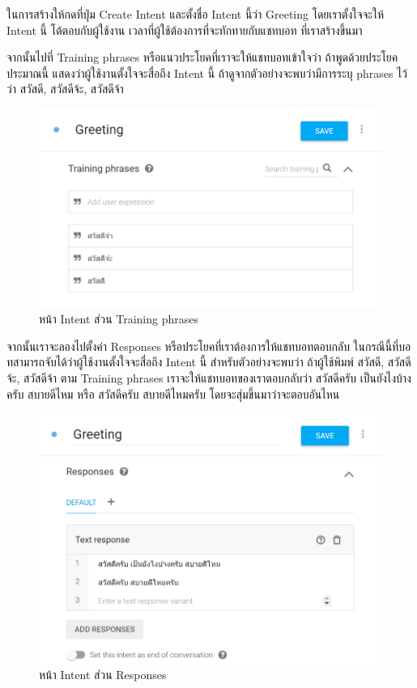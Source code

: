 \begin{enumerate}
	ในการสร้างให้กดที่ปุ่ม Create Intent และตั้งชื่อ Intent นี้ว่า Greeting โดยเราตั้งใจจะให้ Intent นี้ โต้ตอบกับผู้ใช้งาน เวลาที่ผู้ใช้ต้องการที่จะทักทายกับแชทบอท ที่เราสร้างขึ้นมา

	จากนั้นไปที่ Training phrases หรือแนวประโยคที่เราจะให้แชทบอทเข้าใจว่า ถ้าพูดด้วยประโยคประมาณนี้ แสดงว่าผู้ใช้งานตั้งใจจะสื่อถึง Intent นี้ ถ้าดูจากตัวอย่างจะพบว่ามีการระบุ phrases ไว้ว่า สวัสดี, สวัสดีจ้ะ, สวัสดีจ้า

	\begin{figure}[H]
		\centering
		\includegraphics[width=0.7\columnwidth]{Figures/2/dialogflow_3}
		\caption{หน้า Intent ส่วน Training phrases}
		\label{Fig:dialogflow3}
	\end{figure}
	
	จากนั้นเราจะลองไปตั้งค่า Responses หรือประโยคที่เราต้องการให้แชทบอทตอบกลับ ในกรณีนี้ที่บอทสามารถจับได้ว่าผู้ใช้งานตั้งใจจะสื่อถึง Intent นี้ สำหรับตัวอย่างจะพบว่า ถ้าผู้ใช้พิมพ์ สวัสดี, สวัสดีจ้ะ, สวัสดีจ้า ตาม Training phrases เราจะให้แชทบอทของเราตอบกลับว่า สวัสดีครับ เป็นยังไงบ้างครับ สบายดีไหม หรือ สวัสดีครับ สบายดีไหมครับ โดยจะสุ่มขึ้นมาว่าจะตอบอันไหน
	
	\begin{figure}[H]
		\centering
		\includegraphics[width=0.7\columnwidth]{Figures/2/dialogflow_4}
		\caption{หน้า Intent ส่วน Responses}
		\label{Fig:dialogflow4}
	\end{figure}


\end{enumerate}
